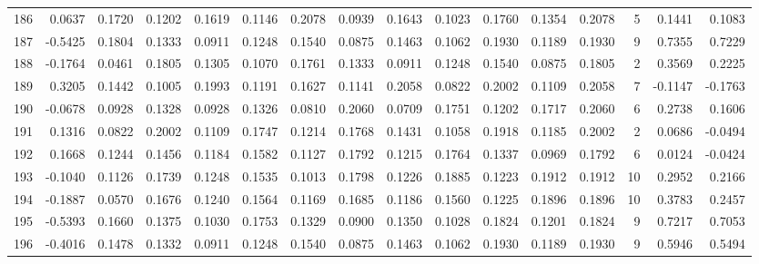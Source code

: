 \begin{tabular}{lrrrrrrrrrrrrrrr}
186 &      0.0637 &  0.1720 &  0.1202 &  0.1619 &  0.1146 &  0.2078 &  0.0939 &  0.1643 &  0.1023 &  0.1760 &   0.1354 &     0.2078 &      5 &                    0.1441 &                     0.1083 \\
187 &     -0.5425 &  0.1804 &  0.1333 &  0.0911 &  0.1248 &  0.1540 &  0.0875 &  0.1463 &  0.1062 &  0.1930 &   0.1189 &     0.1930 &      9 &                    0.7355 &                     0.7229 \\
188 &     -0.1764 &  0.0461 &  0.1805 &  0.1305 &  0.1070 &  0.1761 &  0.1333 &  0.0911 &  0.1248 &  0.1540 &   0.0875 &     0.1805 &      2 &                    0.3569 &                     0.2225 \\
189 &      0.3205 &  0.1442 &  0.1005 &  0.1993 &  0.1191 &  0.1627 &  0.1141 &  0.2058 &  0.0822 &  0.2002 &   0.1109 &     0.2058 &      7 &                   -0.1147 &                    -0.1763 \\
190 &     -0.0678 &  0.0928 &  0.1328 &  0.0928 &  0.1326 &  0.0810 &  0.2060 &  0.0709 &  0.1751 &  0.1202 &   0.1717 &     0.2060 &      6 &                    0.2738 &                     0.1606 \\
191 &      0.1316 &  0.0822 &  0.2002 &  0.1109 &  0.1747 &  0.1214 &  0.1768 &  0.1431 &  0.1058 &  0.1918 &   0.1185 &     0.2002 &      2 &                    0.0686 &                    -0.0494 \\
192 &      0.1668 &  0.1244 &  0.1456 &  0.1184 &  0.1582 &  0.1127 &  0.1792 &  0.1215 &  0.1764 &  0.1337 &   0.0969 &     0.1792 &      6 &                    0.0124 &                    -0.0424 \\
193 &     -0.1040 &  0.1126 &  0.1739 &  0.1248 &  0.1535 &  0.1013 &  0.1798 &  0.1226 &  0.1885 &  0.1223 &   0.1912 &     0.1912 &     10 &                    0.2952 &                     0.2166 \\
194 &     -0.1887 &  0.0570 &  0.1676 &  0.1240 &  0.1564 &  0.1169 &  0.1685 &  0.1186 &  0.1560 &  0.1225 &   0.1896 &     0.1896 &     10 &                    0.3783 &                     0.2457 \\
195 &     -0.5393 &  0.1660 &  0.1375 &  0.1030 &  0.1753 &  0.1329 &  0.0900 &  0.1350 &  0.1028 &  0.1824 &   0.1201 &     0.1824 &      9 &                    0.7217 &                     0.7053 \\
196 &     -0.4016 &  0.1478 &  0.1332 &  0.0911 &  0.1248 &  0.1540 &  0.0875 &  0.1463 &  0.1062 &  0.1930 &   0.1189 &     0.1930 &      9 &                    0.5946 &                     0.5494 \\

\end{tabular}
